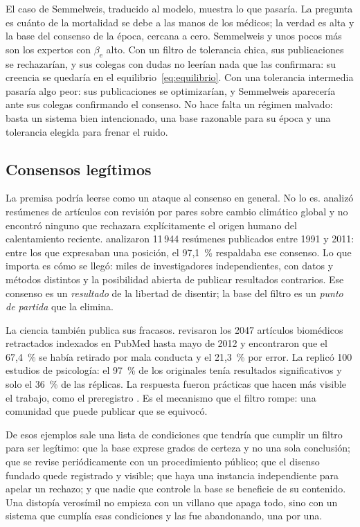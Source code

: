 \documentclass[11pt,a4paper]{article}
\begin{document}
El caso de Semmelweis, traducido al modelo, muestra lo que pasaría. La pregunta es cuánto de la mortalidad se debe a las manos de los médicos; la verdad es alta y la base del consenso de la época, cercana a cero. Semmelweis y unos pocos más son los expertos con $\beta_{\mathrm{e}}$ alto. Con un filtro de tolerancia chica, sus publicaciones se rechazarían, y sus colegas con dudas no leerían nada que las confirmara: su creencia se quedaría en el equilibrio~\eqref{eq:equilibrio}. Con una tolerancia intermedia pasaría algo peor: sus publicaciones se optimizarían, y Semmelweis aparecería ante sus colegas confirmando el consenso. No hace falta un régimen malvado: basta un sistema bien intencionado, una base razonable para su época y una tolerancia elegida para frenar el ruido.

\subsection{Consensos legítimos}

La premisa podría leerse como un ataque al consenso en general. No lo es. \textcite{oreskes2004} analizó resúmenes de artículos con revisión por pares sobre cambio climático global y no encontró ninguno que rechazara explícitamente el origen humano del calentamiento reciente. \textcite{cook2013} analizaron 11\,944 resúmenes publicados entre 1991 y 2011: entre los que expresaban una posición, el 97,1~\% respaldaba ese consenso. Lo que importa es cómo se llegó: miles de investigadores independientes, con datos y métodos distintos y la posibilidad abierta de publicar resultados contrarios. Ese consenso es un \emph{resultado} de la libertad de disentir; la base del filtro es un \emph{punto de partida} que la elimina.

La ciencia también publica sus fracasos. \textcite{fang2012} revisaron los 2047 artículos biomédicos retractados indexados en PubMed hasta mayo de 2012 y encontraron que el 67,4~\% se había retirado por mala conducta y el 21,3~\% por error. La \textcite{osc2015} replicó 100 estudios de psicología: el 97~\% de los originales tenía resultados significativos y solo el 36~\% de las réplicas. La respuesta fueron prácticas que hacen más visible el trabajo, como el preregistro \parencite{nosek2018}. Es el mecanismo que el filtro rompe: una comunidad que puede publicar que se equivocó.

De esos ejemplos sale una lista de condiciones que tendría que cumplir un filtro para ser legítimo: que la base exprese grados de certeza y no una sola conclusión; que se revise periódicamente con un procedimiento público; que el disenso fundado quede registrado y visible; que haya una instancia independiente para apelar un rechazo; y que nadie que controle la base se beneficie de su contenido. Una distopía verosímil no empieza con un villano que apaga todo, sino con un sistema que cumplía esas condiciones y las fue abandonando, una por una.
\end{document}
